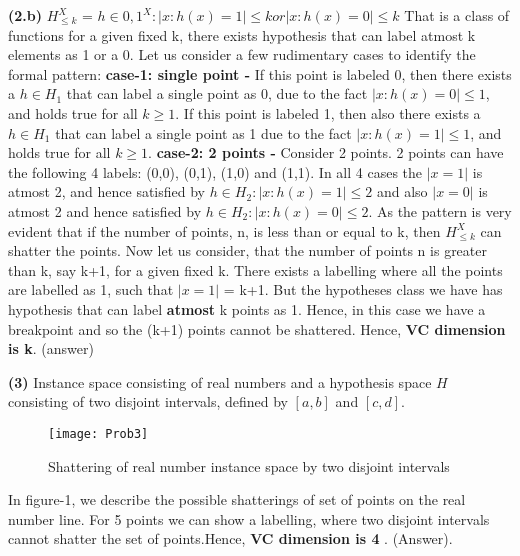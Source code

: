 \documentclass{article}
\renewcommand\part[1]{\vspace{.10in}\textbf{(#1)}}
\begin{document}
    \part{2.b}
    $H_{\leq k}^X$ = ${ h \in {0,1}^X : |{x:h(x)=1}| \leq k or |{x:h(x)=0}| \leq k}$ \newline
    That is a class of functions for a given fixed k, there exists hypothesis that can label atmost k elements as 1 or a 0. Let us consider a few rudimentary cases to identify the formal pattern: \newline
    \textbf {case-1: single point - }  If this point is labeled 0, then there exists a $h \in H_{1}$ that can label a single point as 0, due to the fact $|{x:h(x)=0}| \leq 1$, and holds true for all $k \geq 1$. \newline
    If this point is labeled 1, then also there exists a $h \in H_{1}$ that can label a single point as 1 due to the fact $|{x:h(x)=1}| \leq 1$, and holds true for all $k \geq 1$. \newline
    \textbf {case-2: 2 points - } Consider 2 points. 2 points can have the following 4 labels: (0,0), (0,1), (1,0) and (1,1). In all 4 cases the $|x=1|$ is atmost 2, and hence satisfied by $h \in H_{2}:|x:h(x)=1| \leq 2$ and also $|x=0|$ is atmost 2 and hence satisfied by $h \in H_{2}:|x:h(x)=0| \leq 2$. \newline
    As the pattern is very evident that if the number of points, n, is less than or equal to k, then $H_{\leq k}^X$ can shatter the points.  \newline
    Now let us consider, that the number of points n is greater than k, say k+1, for a given fixed k. There exists a labelling where all the points are labelled as 1, such that $|x=1|$ = k+1. But the hypotheses class we have has hypothesis that can label \textbf {atmost} k points as 1. Hence, in this case we have a breakpoint and so the (k+1)  points cannot be shattered. \newline
    Hence, \textbf {VC dimension is k}. (answer) \newline

	\part{3} Instance space consisting of real numbers and a hypothesis space $H$ consisting of two disjoint intervals, defined by $[a,b]$ and $[c,d]$. \newline
  \begin{figure}[h!]
   \centering
  \texttt{[image: Prob3]}
  \caption{Shattering of real number instance  space by two disjoint intervals}
  \end{figure}
  In figure-1, we describe the possible shatterings of set of points on the real number line. For 5 points we can show a labelling, where two disjoint intervals cannot shatter the set of points.Hence, \textbf {VC dimension is 4} . (Answer). \newline
  

  
  
	
    
    
\end{document}
